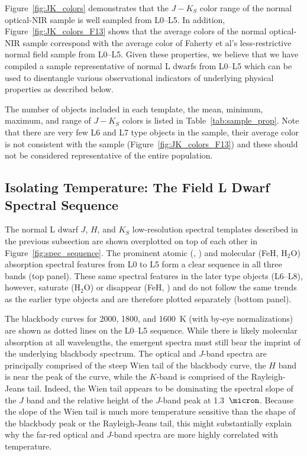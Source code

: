 \documentclass[12pt,preprint]{aastex}
\begin{document}
Figure~\ref{fig:JK_colors} demonstrates that the $J-K_S$ color range of the normal optical-NIR sample is well sampled from L0--L5. 
In addition, Figure~\ref{fig:JK_colors_F13} shows that the average colors of the normal optical-NIR sample correspond with the average color of Faherty et al's less-restrictive normal field sample from L0--L5. 
Given these properties, we believe that we have compiled a sample representative of normal L dwarfs from L0--L5 which can be used to disentangle various observational indicators of underlying physical properties as described below.

The number of objects included in each template, the mean, minimum, maximum, and range of $J-K_S$ colors is listed in Table~\ref{tab:sample_prop}. Note that there are very few L6 and L7 type objects in the sample, their average color is not consistent with the \cite{Faherty13_0355} sample (Figure~\ref{fig:JK_colors_F13}) and these should not be considered representative of the entire population.

\subsection{Isolating Temperature: The Field L Dwarf Spectral Sequence}
\label{sec:temp}
The normal L dwarf $J$, $H$, and $K_S$ low-resolution spectral templates described in the previous subsection are shown overplotted on top of each other in Figure~\ref{fig:spec_sequence}. 
The prominent atomic (, ) and molecular (FeH, H$_2$O) absorption spectral features from L0 to L5 form a clear sequence in all three bands (top panel).
These same spectral features in the later type objects (L6--L8), however, saturate (H$_2$O) or disappear (FeH, ) and do not follow the same trends as the earlier type objects and are therefore plotted separately (bottom panel).

The blackbody curves for 2000, 1800, and 1600~K (with by-eye normalizations) are shown as dotted lines on the L0--L5 sequence. 
While there is likely molecular absorption at all wavelengths, the emergent spectra must still bear the imprint of the underlying blackbody spectrum.
The optical and $J$-band spectra are principally comprised of the steep Wien tail of the blackbody curve,
the $H$ band is near the peak of the curve, while the $K$-band is comprised of the Rayleigh-Jeans tail.
Indeed, the Wien tail appears to be dominating the spectral slope of the $J$ band and the relative height of the $J$-band peak at 1.3~$\micron$.
Because the slope of the Wien tail is much more temperature sensitive than the shape of the blackbody peak or the Rayleigh-Jeans tail, this might substantially explain why the far-red optical and $J$-band spectra are more highly correlated with temperature.
\end{document}
